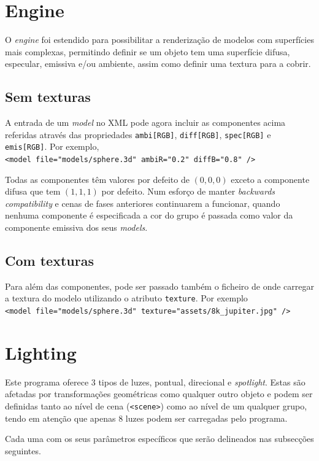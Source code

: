 \documentclass[a4paper]{article}
\begin{document}
\section{Engine}

O \textit{engine} foi estendido para possibilitar a renderização de
modelos com superfícies mais complexas, permitindo definir se um objeto tem uma
superfície difusa, especular, emissiva e/ou ambiente, assim como definir uma
textura para a cobrir.

\subsection{Sem texturas}
A entrada de um \textit{model} no XML pode agora incluir as componentes acima
referidas através das propriedades \texttt{ambi[RGB]}, \texttt{diff[RGB]},
\texttt{spec[RGB]} e \texttt{emis[RGB]}. Por exemplo,\\
\verb!<model file="models/sphere.3d" ambiR="0.2" diffB="0.8" />!

Todas as componentes têm valores por defeito de $(0,0,0)$ exceto a componente
difusa que tem $(1,1,1)$ por defeito. Num esforço de manter \textit{backwards
compatibility} e cenas de fases anteriores continuarem a funcionar, quando
nenhuma componente é especificada a cor do grupo é passada como valor da
componente emissiva dos seus \textit{models}.

\subsection{Com texturas}

Para além das componentes, pode ser passado também o ficheiro de onde carregar
a textura do modelo utilizando o atributo \texttt{texture}. Por exemplo\\
\verb!<model file="models/sphere.3d" texture="assets/8k_jupiter.jpg" />!

\section{Lighting}

Este programa oferece 3 tipos de luzes, pontual, direcional e
\textit{spotlight}. Estas são afetadas  por transformações geométricas como
qualquer outro objeto e podem ser definidas tanto ao nível de cena
(\texttt{<scene>}) como ao nível de um qualquer grupo, tendo em atenção que
apenas 8 luzes podem ser carregadas pelo programa.

Cada uma com os seus parâmetros específicos que serão delineados nas subsecções
seguintes.
\end{document}

